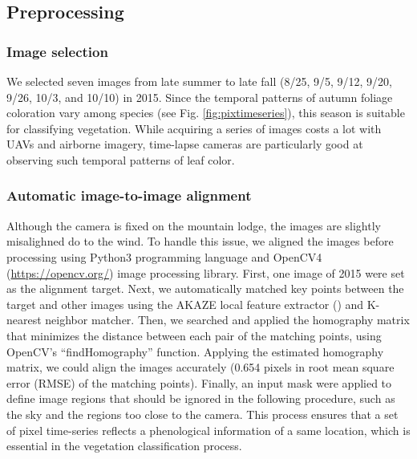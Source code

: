 \documentclass{article}
\begin{document}
\hypertarget{preprocessing}{%
\subsection{Preprocessing}\label{preprocessing}}

\hypertarget{image-selection}{%
\subsubsection{Image selection}\label{image-selection}}

We selected seven images from late summer to late fall (8/25, 9/5, 9/12, 9/20, 9/26, 10/3, and 10/10) in 2015. Since the temporal patterns of autumn foliage coloration vary among species (see Fig. \ref{fig:pixtimeseries}), this season is suitable for classifying vegetation. While acquiring a series of images costs a lot with UAVs and airborne imagery, time-lapse cameras are particularly good at observing such temporal patterns of leaf color.

\hypertarget{automatic-image-to-image-alignment}{%
\subsubsection{Automatic image-to-image alignment}\label{automatic-image-to-image-alignment}}

Although the camera is fixed on the mountain lodge, the images are slightly misalighned do to the wind. To handle this issue, we aligned the images before processing using Python3 programming language and OpenCV4 (\url{https://opencv.org/}) image processing library. First, one image of 2015 were set as the alignment target. Next, we automatically matched key points between the target and other images using the AKAZE local feature extractor (\cite{Alcantarilla2013AKAZE}) and K-nearest neighbor matcher. Then, we searched and applied the homography matrix that minimizes the distance between each pair of the matching points, using OpenCV's ``findHomography'' function. Applying the estimated homography matrix, we could align the images accurately (0.654 pixels in root mean square error (RMSE) of the matching points). Finally, an input mask were applied to define image regions that should be ignored in the following procedure, such as the sky and the regions too close to the camera. This process ensures that a set of pixel time-series reflects a phenological information of a same location, which is essential in the vegetation classification process.
\end{document}
